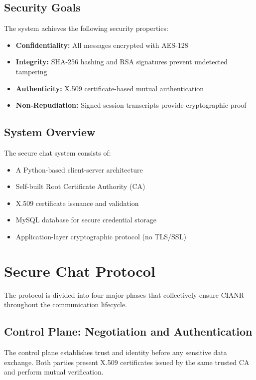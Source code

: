 \documentclass[runningheads]{llncs}
\begin{document}
\subsection{Security Goals}

The system achieves the following security properties:
\begin{itemize}
    \item \textbf{Confidentiality:} All messages encrypted with AES-128
    \item \textbf{Integrity:} SHA-256 hashing and RSA signatures prevent undetected tampering
    \item \textbf{Authenticity:} X.509 certificate-based mutual authentication
    \item \textbf{Non-Repudiation:} Signed session transcripts provide cryptographic proof
\end{itemize}

\subsection{System Overview}

The secure chat system consists of:
\begin{itemize}
    \item A Python-based client-server architecture
    \item Self-built Root Certificate Authority (CA)
    \item X.509 certificate issuance and validation
    \item MySQL database for secure credential storage
    \item Application-layer cryptographic protocol (no TLS/SSL)
\end{itemize}

\section{Secure Chat Protocol}

The protocol is divided into four major phases that collectively ensure CIANR throughout the communication lifecycle.

\subsection{Control Plane: Negotiation and Authentication}

The control plane establishes trust and identity before any sensitive data exchange. Both parties present X.509 certificates issued by the same trusted CA and perform mutual verification.
\end{document}
